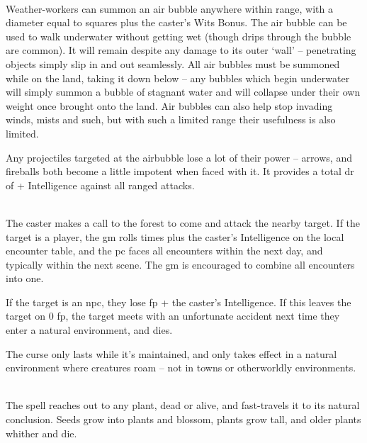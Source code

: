 \begin{multicols}{2}
\\
Weather-workers can summon an air bubble anywhere within range, with a diameter equal to  squares plus the caster's Wits Bonus. The air bubble can be used to walk underwater without getting wet (though drips through the bubble are common). It will remain despite any damage to its outer `wall' -- penetrating objects simply slip in and out seamlessly. All air bubbles must be summoned while on the land, taking it down below -- any bubbles which begin underwater will simply summon a bubble of stagnant water and will collapse under their own weight once brought onto the land. Air bubbles can also help stop invading winds, mists and such, but with such a limited range their usefulness is also limited.

Any projectiles targeted at the airbubble lose a lot of their power -- arrows, and fireballs both become a little impotent when faced with it.
It provides a total \gls{dr} of  + Intelligence against all ranged attacks.

\spelllevel

\\
The caster makes a call to the forest to come and attack the nearby target.  If the target is a player, the \gls{gm} rolls  times plus the caster's Intelligence on the local encounter table, and the \gls{pc} faces all encounters within the next day, and typically within the next scene.  The \gls{gm} is encouraged to combine all encounters into one.

If the target is an \gls{npc}, they lose  \gls{fp} + the caster's Intelligence.
If this leaves the target on 0 \gls{fp}, the target meets with an unfortunate accident next time they enter a natural environment, and dies.

The curse only lasts while it's maintained, and only takes effect in a natural environment where creatures roam -- not in towns or otherworldly environments.

\\
The spell reaches out to any plant, dead or alive, and fast-travels it to its natural conclusion.
Seeds grow into plants and blossom, plants grow tall, and older plants whither and die.

\begin{figure}

	\begin{rollchart}


\end{rollchart}
\end{figure}
\end{multicols}
